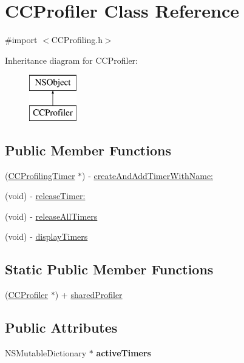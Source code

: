 \hypertarget{interface_c_c_profiler}{\section{C\-C\-Profiler Class Reference}
\label{interface_c_c_profiler}
}


{\ttfamily \#import $<$C\-C\-Profiling.\-h$>$}

Inheritance diagram for C\-C\-Profiler\-:\begin{figure}[H]
\begin{center}
\leavevmode
\includegraphics[height=2.000000cm]{interface_c_c_profiler}
\end{center}
\end{figure}
\subsection*{Public Member Functions}
\begin{DoxyCompactItemize}
\item 
(\hyperlink{interface_c_c_profiling_timer}{C\-C\-Profiling\-Timer} $\ast$) -\/ \hyperlink{interface_c_c_profiler_a3a578aa7f4e99e0ff80a84605946e57e}{create\-And\-Add\-Timer\-With\-Name\-:}
\item 
(void) -\/ \hyperlink{interface_c_c_profiler_ab1cd2a11a1429a370126afe6d7202604}{release\-Timer\-:}
\item 
(void) -\/ \hyperlink{interface_c_c_profiler_a277fbe38964f09f78faf6b9573d78ddd}{release\-All\-Timers}
\item 
(void) -\/ \hyperlink{interface_c_c_profiler_a32c7e90849dc44865be9ea55c5a0f5af}{display\-Timers}
\end{DoxyCompactItemize}
\subsection*{Static Public Member Functions}
\begin{DoxyCompactItemize}
\item 
(\hyperlink{interface_c_c_profiler}{C\-C\-Profiler} $\ast$) + \hyperlink{interface_c_c_profiler_ab0caeb707d184d1f30bd61aeb0436005}{shared\-Profiler}
\end{DoxyCompactItemize}
\subsection*{Public Attributes}
\begin{DoxyCompactItemize}
\item 
\hypertarget{interface_c_c_profiler_ac673cb6ffb771c1e39a34c62eb7e2259}{N\-S\-Mutable\-Dictionary $\ast$ {\bfseries active\-Timers}}\label{interface_c_c_profiler_ac673cb6ffb771c1e39a34c62eb7e2259}

\end{DoxyCompactItemize}


